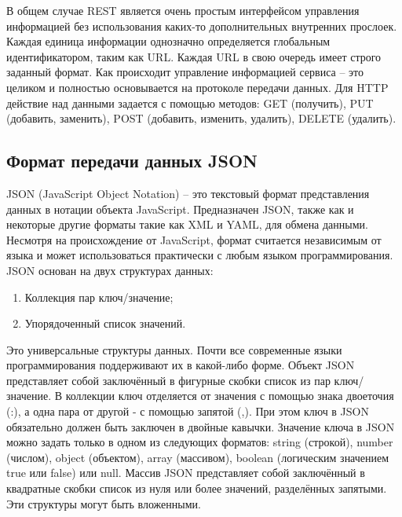 В общем случае REST является очень простым интерфейсом управления информацией без использования каких-то дополнительных внутренних прослоек. Каждая единица информации однозначно определяется глобальным идентификатором, таким как URL. Каждая URL в свою очередь имеет строго заданный формат. Как происходит управление информацией сервиса – это целиком и полностью основывается на протоколе передачи данных. Для HTTP действие над данными задается с помощью методов: GET (получить), PUT (добавить, заменить), POST (добавить, изменить, удалить), DELETE (удалить).

\subsection{Формат передачи данных JSON}
JSON (JavaScript Object Notation) – это текстовый формат представления данных в нотации объекта JavaScript. Предназначен JSON, также как и некоторые другие форматы такие как XML и YAML, для обмена данными. Несмотря на происхождение от JavaScript, формат считается независимым от языка и может использоваться практически с любым языком программирования. JSON основан на двух структурах данных:
\begin{enumerate}
	\item Коллекция пар ключ/значение;
	\item Упорядоченный список значений.
\end{enumerate}
Это универсальные структуры данных. Почти все современные языки программирования поддерживают их в какой-либо форме. Объект JSON представляет собой заключённый в фигурные скобки список из пар ключ/значение. В коллекции ключ отделяется от значения с помощью знака двоеточия (:), а одна пара от другой - с помощью запятой (,). При этом ключ в JSON обязательно должен быть заключен в двойные кавычки. Значение ключа в JSON можно задать только в одном из следующих форматов: string (строкой), number (числом), object (объектом), array (массивом), boolean (логическим значением true или false) или null. Массив JSON представляет собой заключённый в квадратные скобки список из нуля или более значений, разделённых запятыми. Эти структуры могут быть вложенными.

